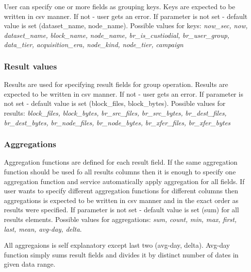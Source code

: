 User can specify one or more fields as grouping keys. Keys are expected to be written in csv manner. If not - user gets an error. If parameter is not set - 
default value is set (dataset{\_}name, node{\_}name). Possible values for keys:
\textit{now{\_}sec, now, dataset{\_}name, block{\_}name, node{\_}name, br{\_}is{\_}custiodial, br{\_}user{\_}group, data{\_}tier, acquisition{\_}era, node{\_}kind, 
node{\_}tier, campaign}

\subsubsection{Result values}

Results are used for specifying result fields for group operation. Results are expected to be written in csv manner. If not - user gets an error. If parameter is 
not set - default value is set (block{\_}files, block{\_}bytes). Possible values for results:
\textit{block{\_}files, block{\_}bytes, br{\_}src{\_}files, br{\_}src{\_}bytes, br{\_}dest{\_}files, br{\_}dest{\_}bytes, br{\_}node{\_}files, br{\_}node{\_}bytes, 
br{\_}xfer{\_}files, br{\_}xfer{\_}bytes}

\subsubsection{Aggregations}

Aggregation functions are defined for each result field. If the same aggregation function should be used fo all results columns then it is enough to specify one 
aggregation function and service automatically apply aggregation for all fields. If user wants to specify different aggregation functions for different columns 
then aggregations is expected to be written in csv manner and in the exact order as results were specified. If parameter is not set - default value is set (sum) 
for all results elements. Possible values for aggregations:
\textit{sum, count, min, max, first, last, mean, avg-day, delta}.


All aggregaions is self explanatory except last two (avg-day, delta). Avg-day function simply sums result fields and divides it by distinct number of dates in 
given data range.


